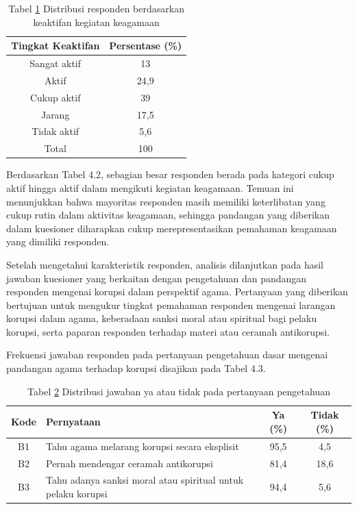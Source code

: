 \begin{table}[H]
\centering
\captionsetup{labelformat=empty}
\caption[Distribusi responden berdasarkan keaktifan kegiatan keagamaan]{Tabel \ref{tab:Tabelkeaktifan} Distribusi responden berdasarkan keaktifan kegiatan keagamaan}
\label{tab:Tabelkeaktifan}
\begin{tabular}{ |c|c| } 
\hline
\textbf{Tingkat Keaktifan} & \textbf{Persentase (\%)} \\
\hline
Sangat aktif & 13 \\ 
\hline
Aktif & 24,9 \\
\hline
Cukup aktif & 39 \\
\hline
Jarang & 17,5 \\
\hline
Tidak aktif & 5,6 \\
\hline
Total & 100\\
\hline
\end{tabular}
\end{table}

Berdasarkan Tabel 4.2, sebagian besar responden berada pada kategori cukup aktif hingga aktif dalam mengikuti kegiatan keagamaan. Temuan ini menunjukkan bahwa mayoritas responden masih memiliki keterlibatan yang cukup rutin dalam aktivitas keagamaan, sehingga pandangan yang diberikan dalam kuesioner diharapkan cukup merepresentasikan pemahaman keagamaan yang dimiliki responden.

Setelah mengetahui karakteristik responden, analisis dilanjutkan pada hasil jawaban kuesioner yang berkaitan dengan pengetahuan dan pandangan responden mengenai korupsi dalam perspektif agama. Pertanyaan yang diberikan bertujuan untuk mengukur tingkat pemahaman responden mengenai larangan korupsi dalam agama, keberadaan sanksi moral atau spiritual bagi pelaku korupsi, serta paparan responden terhadap materi atau ceramah antikorupsi. 

Frekuensi jawaban responden pada pertanyaan pengetahuan dasar mengenai pandangan agama terhadap korupsi disajikan pada Tabel 4.3. 

\begin{table}[h]
\centering
\captionsetup{labelformat=empty}
\caption[Distribusi Jawaban Ya atau Tidak pada Pertanyaan Pengetahuan]{Tabel \ref{tab:Tabelpengetahuan} Distribusi jawaban ya atau tidak pada pertanyaan pengetahuan}
\label{tab:Tabelpengetahuan}
\begin{tabular}{ |c|p{8cm}|c|c| } 
\hline
\textbf{Kode} & \textbf{Pernyataan} & \textbf{Ya (\%)} & \textbf{Tidak (\%)} \\
\hline
B1 & Tahu agama melarang korupsi secara eksplisit & 95,5 & 4,5 \\ 
\hline
B2 & Pernah mendengar ceramah antikorupsi & 81,4 & 18,6 \\
\hline
B3 & Tahu adanya sanksi moral atau spiritual untuk pelaku korupsi & 94,4 & 5,6 \\
\hline
\end{tabular}
\end{table}


